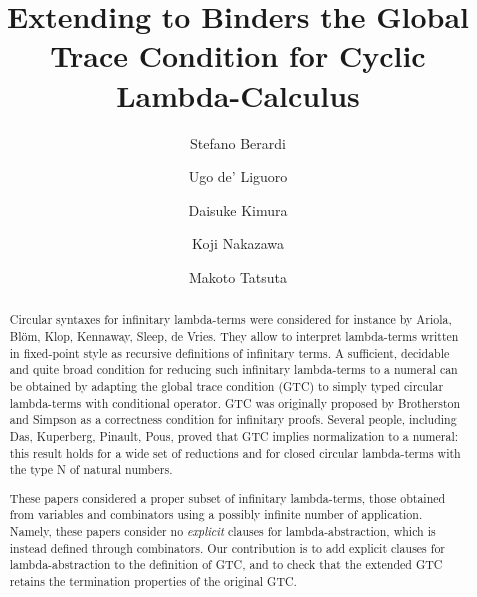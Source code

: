\documentclass[a4paper,anonymous]{lipics-v2021}
\title{Extending to Binders the Global Trace Condition for Cyclic Lambda-Calculus}
\author
    {Stefano Berardi}
    {Computer Science Department, Turin University, Torino, Italy}
    {} %
    {0000-0001-5427-0020} %
    {} %
\author
    {Ugo de' Liguoro}
    {Computer Science Department, Turin University, Torino, Italy}
    {} %
    {} %
    {} %
\author
    {Daisuke Kimura}
    {Department of Information Science, Toho University, Japan}
    {} %
    {} %
    {} %
\author
    {Koji Nakazawa}
    {Graduate School of Informatics, Nagoya University, Japan}
    {} %
    {} %
    {} %
\author
    {Makoto Tatsuta}
    {National Institute of Informatics/Sokendai, Tokyo, Japan}
    {} %
    {} %
    {} %
\begin{document}
\maketitle

\begin{abstract}
Circular syntaxes for infinitary lambda-terms
were considered for instance by Ariola, Bl\"{o}m, Klop, Kennaway, Sleep, de Vries.
They allow to interpret lambda-terms written in fixed-point style 
as recursive definitions of infinitary terms. 
A sufficient, decidable and quite broad condition for reducing such 
infinitary lambda-terms to a numeral can be obtained
by adapting the global trace condition (GTC) to simply typed 
circular lambda-terms with conditional operator. 
GTC was originally proposed by Brotherston and Simpson
as a correctness condition for infinitary proofs.
Several people, including Das, Kuperberg, Pinault, Pous,
proved that GTC implies normalization to a numeral:
this result holds for a wide set of reductions and for closed circular lambda-terms 
with the type N of natural numbers. 

These papers considered a proper subset of infinitary lambda-terms, those
obtained from variables and combinators using a possibly infinite number of application.
Namely, these papers consider no \emph{explicit} clauses for lambda-abstraction,
which is instead defined through combinators.
Our contribution is to add explicit clauses for lambda-abstraction
to the definition of GTC, and to check that 
the extended GTC retains the termination properties of the original GTC. 
\end{abstract}




























\end{document}
